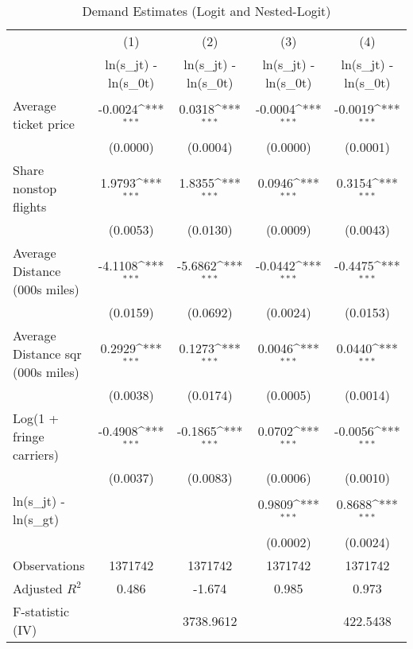 \begin{table}[htbp]\centering
\def\sym#1{\ifmmode^{#1}\else\(^{#1}\)\fi}
\caption{Demand Estimates (Logit and Nested-Logit)}
\begin{tabular}{l*{4}{c}}
\toprule
                    &\multicolumn{1}{c}{(1)}&\multicolumn{1}{c}{(2)}&\multicolumn{1}{c}{(3)}&\multicolumn{1}{c}{(4)}\\
                    &\multicolumn{1}{c}{ln(s\_jt) - ln(s\_0t)}&\multicolumn{1}{c}{ln(s\_jt) - ln(s\_0t)}&\multicolumn{1}{c}{ln(s\_jt) - ln(s\_0t)}&\multicolumn{1}{c}{ln(s\_jt) - ln(s\_0t)}\\
\midrule
Average ticket price&     -0.0024\sym{***}&      0.0318\sym{***}&     -0.0004\sym{***}&     -0.0019\sym{***}\\
                    &    (0.0000)         &    (0.0004)         &    (0.0000)         &    (0.0001)         \\
\addlinespace
Share nonstop flights &      1.9793\sym{***}&      1.8355\sym{***}&      0.0946\sym{***}&      0.3154\sym{***}\\
                    &    (0.0053)         &    (0.0130)         &    (0.0009)         &    (0.0043)         \\
\addlinespace
Average Distance (000s miles)&     -4.1108\sym{***}&     -5.6862\sym{***}&     -0.0442\sym{***}&     -0.4475\sym{***}\\
                    &    (0.0159)         &    (0.0692)         &    (0.0024)         &    (0.0153)         \\
\addlinespace
Average Distance sqr (000s miles)&      0.2929\sym{***}&      0.1273\sym{***}&      0.0046\sym{***}&      0.0440\sym{***}\\
                    &    (0.0038)         &    (0.0174)         &    (0.0005)         &    (0.0014)         \\
\addlinespace
Log(1 + fringe carriers)&     -0.4908\sym{***}&     -0.1865\sym{***}&      0.0702\sym{***}&     -0.0056\sym{***}\\
                    &    (0.0037)         &    (0.0083)         &    (0.0006)         &    (0.0010)         \\
\addlinespace
ln(s\_jt) - ln(s\_gt) &                     &                     &      0.9809\sym{***}&      0.8688\sym{***}\\
                    &                     &                     &    (0.0002)         &    (0.0024)         \\
\midrule
Observations        &     1371742         &     1371742         &     1371742         &     1371742         \\
Adjusted \(R^{2}\)  &       0.486         &      -1.674         &       0.985         &       0.973         \\
F-statistic (IV)    &                     &   3738.9612         &                     &    422.5438         \\
\bottomrule
\end{tabular}
\end{table}
